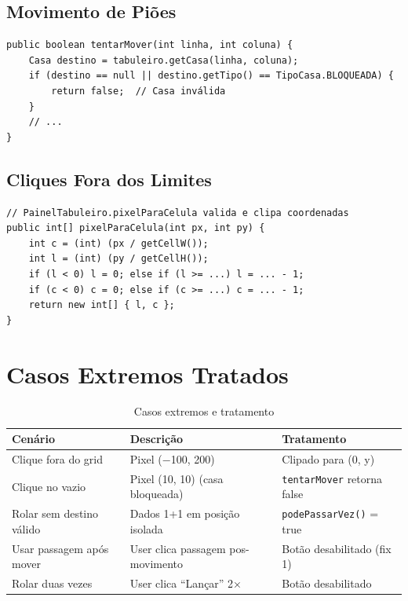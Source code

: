 \documentclass[12pt,a4paper]{report}
\begin{document}
\subsection{Movimento de Piões}

\begin{lstlisting}
public boolean tentarMover(int linha, int coluna) {
    Casa destino = tabuleiro.getCasa(linha, coluna);
    if (destino == null || destino.getTipo() == TipoCasa.BLOQUEADA) {
        return false;  // Casa inválida
    }
    // ...
}
\end{lstlisting}

\subsection{Cliques Fora dos Limites}

\begin{lstlisting}
// PainelTabuleiro.pixelParaCelula valida e clipa coordenadas
public int[] pixelParaCelula(int px, int py) {
    int c = (int) (px / getCellW());
    int l = (int) (py / getCellH());
    if (l < 0) l = 0; else if (l >= ...) l = ... - 1;
    if (c < 0) c = 0; else if (c >= ...) c = ... - 1;
    return new int[] { l, c };
}
\end{lstlisting}

\section{Casos Extremos Tratados}

\begin{table}[H]
\centering
\begin{tabular}{|l|p{6cm}|l|}
\hline
\textbf{Cenário} & \textbf{Descrição} & \textbf{Tratamento} \\
\hline
Clique fora do grid & Pixel (−100, 200) & Clipado para (0, y) \\
\hline
Clique no vazio & Pixel (10, 10) (casa bloqueada) & \texttt{tentarMover} retorna false \\
\hline
Rolar sem destino válido & Dados 1+1 em posição isolada & \texttt{podePassarVez()} = true \\
\hline
Usar passagem após mover & User clica passagem pos-movimento & Botão desabilitado (fix 1) \\
\hline
Rolar duas vezes & User clica ``Lançar'' 2× & Botão desabilitado \\
\hline
\end{tabular}
\caption{Casos extremos e tratamento}
\end{table}
\end{document}
